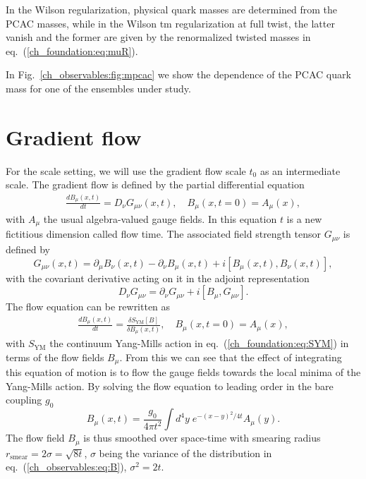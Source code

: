 In the Wilson regularization, physical quark masses are determined from the PCAC masses, while in the Wilson tm regularization at full twist, the latter vanish and the former are given by the renormalized twisted masses in eq.~(\ref{ch_foundation:eq:muR}).

In Fig.~\ref{ch_observables:fig:mpcac} we show the dependence of the PCAC quark mass for one of the ensembles under study.


\section{Gradient flow}
\label{ch_observables:sec:Flow}

For the scale setting, we will use the gradient flow scale $t_0$ as an intermediate scale. The gradient flow is defined by the partial differential equation~\citep{Luscher:2010we,1006.4518}
\begin{gather}
\label{ch_observables:eq:flow}
\frac{dB_{\mu}(x,t)}{dt}=D_{\nu}G_{\mu\nu}(x,t), \quad B_{\mu}(x,t=0)=A_{\mu}(x),
\end{gather}
with $A_{\mu}$ the usual algebra-valued gauge fields. In this equation $t$ is a new fictitious dimension called flow time. The associated field strength tensor $G_{\mu\nu}$ is defined by
\begin{equation}
G_{\mu\nu}(x,t)=\partial_{\mu}B_{\nu}(x,t)-\partial_{\nu}B_{\mu}(x,t)+i\left[B_{\mu}(x,t),B_{\nu}(x,t)\right],
\end{equation}
with the covariant derivative acting on it in the adjoint representation
\begin{equation}
D_{\nu}G_{\mu\nu}=\partial_{\nu}G_{\mu\nu}+i\left[B_{\mu},G_{\mu\nu}\right].
\end{equation}
The flow equation can be rewritten as
\begin{gather}
\frac{dB_{\mu}(x,t)}{dt}=\frac{\delta S_{\textrm{YM}}[B]}{\delta B_{\mu}(x,t)}, \quad B_{\mu}(x,t=0)=A_{\mu}(x),
\end{gather}
with $S_{\textrm{YM}}$ the continuum Yang-Mills action in eq.~(\ref{ch_foundation:eq:SYM}) in terms of the flow fields $B_{\mu}$. From this we can see that the effect of integrating this equation of motion is to flow the gauge fields towards the local minima of the Yang-Mills action. By solving the flow equation to leading order in the bare coupling $g_0$
\begin{equation}
\label{ch_observables:eq:B}
B_{\mu}(x,t)=\frac{g_0}{4\pi t^2}\int d^4y\;e^{-(x-y)^2/4t}A_{\mu}(y).
\end{equation}
The flow field $B_{\mu}$ is thus smoothed over space-time with smearing radius $r_{\textrm{smear}}=2\sigma=\sqrt{8t}$, $\sigma$ being the variance of the distribution in eq.~(\ref{ch_observables:eq:B}), $\sigma^2=2t$.

